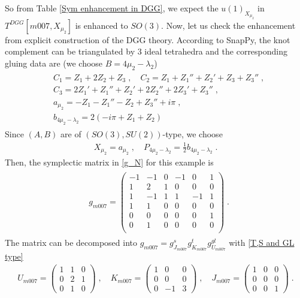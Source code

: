 \documentclass[a4paper,11pt]{article}
\begin{document}
So from Table \ref{Sym enhancement in DGG}, we expect the $u(1)_{X_{\mu_2}}$ in $T^{DGG}[m007, X_{\mu_2}]$ is  enhanced to $SO(3)$. Now, let us check the enhancement from explicit construction of the DGG theory. 
According to SnapPy, the knot complement can be triangulated by 3 ideal tetrahedra and the corresponding gluing data are (we choose $B=4\mu_2-\lambda_2$)
%
\begin{align}
\begin{split}
&C_1 = Z_1 +2Z_2+Z_3\;, \quad C_2 = Z_1+Z_1''+Z_2'+Z_3+Z_3''\;,
\\
&C_3 = 2Z_1'+Z_1''+Z_2'+2Z_2''+2Z_3'+Z_3''\;,
\\
& a_{\mu_2 } = -Z_1 -Z_1''-Z_2+Z_3''+i\pi\;,
\\
&b_{4\mu_2 -\lambda_2} = 2 (- i \pi +Z_1+Z_2) \label{triangulation of m007}
\end{split}
\end{align}
%
Since $(A,B)$ are of $(SO(3),SU(2))$-type, we choose
%
\begin{align}
X_{\mu_2} =  a_{\mu_2 }\;, \quad P_{4\mu_2  - \lambda_2} = \frac{1}2 b_{4\mu_2 - \lambda_2}\;.
\end{align}
%
Then, the symplectic matrix in \eqref{g_N} for this example is 
%
\begin{align}
\begin{split}
& g_{m007} = \left(
\begin{array}{cccccc}
 -1 & -1 & 0 & -1 & 0 & 1 \\
 1 & 2 & 1 & 0 & 0 & 0 \\
 1 & -1 & 1 & 1 & -1 & 1 \\
 1 & 1 & 0 & 0 & 0 & 0 \\
 0 & 0 & 0 & 0 & 0 & 1 \\
 0 & 1 & 0 & 0 & 0 & 0 \\
\end{array}
\right)\;.
\end{split} 
\end{align}
%
The matrix can be decomposed into $g_{m007} = g^s_{J_{m007}} g^t_{K_{m007}} g^{gl}_{U_{m007}}$ with \eqref{T,S and GL type}
%
\begin{align}
U_{m007} = \left(
\begin{array}{ccc}
 1 & 1 & 0 \\
 0 & 2 & 1 \\
 0 & 1 & 0 
\end{array}
\right)\;, \quad K_{m007} = \left(
\begin{array}{ccc}
 1 & 0 & 0 \\
 0 & 0 & 0 \\
 0 & -1 & 3
\end{array}
\right)\;, \quad J_{m007} = \left(
\begin{array}{ccc}
 1 & 0 & 0 \\
 0 & 0 & 0 \\
 0 & 0 & 1
\end{array}
\right)\;.
\end{align}
\end{document}
